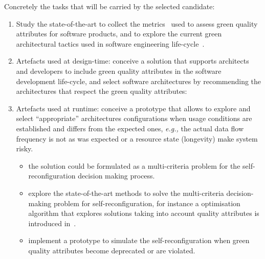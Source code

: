 \documentclass[a4paper,10pt]{article}
\newcommand{\ie}{\textit{i.e.,} }
\newcommand{\eg}{\textit{e.g.,} }
\newcommand{\sota}{state-of-the-art }
\begin{document}
\noindent Concretely the tasks that will be carried by the selected candidate:
\begin{enumerate}
    \item Study the \sota to collect the metrics~\cite{ergasheva2020metrics} used to assess green quality attributes for software products, and  
    to explore the current green architectural tactics used in software engineering life-cycle~\cite{icse/NoureddineR15,taas/ElhabbashSBT19,adhoc/HorcasPF19,infsof/SaputriL21,2021-Paradis}.

    \item Artefacts used at design-time: conceive a solution that supports architects and developers to include green quality attributes in the software development life-cycle, and select software architectures by recommending the architectures that respect the green quality attributes:

     
    \item Artefacts used at runtime: conceive a prototype that allows to explore and select ``appropriate'' architectures configurations when usage conditions are established and differs from the expected ones, \eg the actual data flow frequency is not as was expected or a resource state (longevity) make system risky. 
    \begin{itemize}
        \item the solution could be formulated as a multi-criteria problem for the self-reconfiguration decision making process. %
        \item explore the \sota methods to solve the multi-criteria decision-making problem for self-reconfiguration, for instance a optimisation algorithm that explores solutions taking into account quality attributes is introduced in~\cite{ssbse/KifetewMGSSP17}.
        
        \item implement a prototype to simulate the self-reconfiguration when green quality attributes become deprecated or are violated.
    \end{itemize}
    
\end{enumerate}
\end{document}
